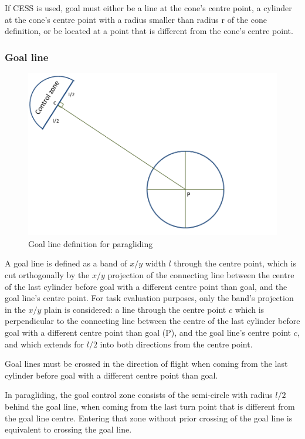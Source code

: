 \documentclass{article}
\begin{document}
\begin{pg}
If CESS is used, goal must either be a line at the cone’s centre point,
a cylinder at the cone’s centre point with a radius smaller than radius r of
the cone definition, or be located at a point that is different from the cone’s
centre point.
\end{pg}

\subsubsection{Goal line}
\label{sec:goal-line}
\begin{figure}[h]
    \includegraphics[scale=0.8]{img/goal-line.png}
    \caption{Goal line definition for paragliding}
\end{figure}

A goal line is defined as a band of \(x/y\) width \(l\) through the centre
point, which is cut orthogonally by the \(x/y\) projection of the connecting
line between the centre of the last cylinder before goal with a different
centre point than goal, and the goal line’s centre point. For task evaluation
purposes, only the band’s projection in the \(x/y\) plain is considered: a line
through the centre point \(c\) which is perpendicular to the connecting line
between the centre of the last cylinder before goal with a different centre
point than goal (P), and the goal line’s centre point \(c\), and which extends
for \(l/2\) into both directions from the centre point.

Goal lines must be crossed in the direction of flight when coming from the last
cylinder before goal with a different centre point than goal.

\begin{pg}
In paragliding, the goal control zone consists of the semi-circle with radius
\(l/2\) behind the goal line, when coming from the last turn point that is
different from the goal line centre. Entering that zone without prior crossing
of the goal line is equivalent to crossing the goal line.
\end{pg}
\end{document}
